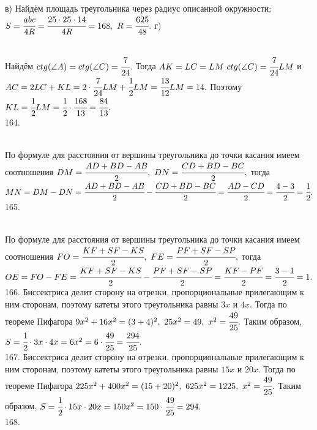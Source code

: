 в) Найдём площадь треугольника через радиус описанной окружности: $S=\cfrac{abc}{4R}=\cfrac{25\cdot25\cdot14}{4R}=168,\ R=\cfrac{625}{48}.$\newpage\noindent
г) \begin{figure}[ht!]
\end{figure}\\
Найдём $ctg(\angle A)=ctg(\angle C)=\cfrac{7}{24}.$ Тогда $AK=LC=LM\ ctg(\angle C)=\cfrac{7}{24}LM$ и $AC=2LC+KL=2\cdot\cfrac{7}{24}LM+\cfrac{1}{2}LM=\cfrac{13}{12}LM=14.$ Поэтому $KL=\cfrac{1}{2}LM=\cfrac{1}{2}\cdot\cfrac{168}{13}=\cfrac{84}{13}.$\\
164. \begin{figure}[ht!]
\end{figure}\\
По формуле для расстояния от вершины треугольника до точки касания имеем соотношения $DM=\cfrac{AD+BD-AB}{2},\ DN=\cfrac{CD+BD-BC}{2},$ тогда\\
$MN=DM-DN=\cfrac{AD+BD-AB}{2}-\cfrac{CD+BD-BC}{2}=\cfrac{AD-CD}{2}=\cfrac{4-3}{2}=\cfrac{1}{2}.$\\
165. \begin{figure}[ht!]
\end{figure}\\
По формуле для расстояния от вершины треугольника до точки касания имеем соотношения $FO=\cfrac{KF+SF-KS}{2},\ FE=\cfrac{PF+SF-SP}{2},$ тогда\\
$OE=FO-FE=\cfrac{KF+SF-KS}{2}-\cfrac{PF+SF-SP}{2}=\cfrac{KF-PF}{2}=\cfrac{3-1}{2}=1.$\\
166. Биссектриса делит сторону на отрезки, пропорциональные прилегающим к ним сторонам, поэтому катеты этого треугольника равны $3x$ и $4x.$ Тогда по теореме Пифагора $9x^2+16x^2=(3+4)^2,\ 25x^2=49,\ x^2=\cfrac{49}{25}.$ Таким образом, $S=\cfrac{1}{2}\cdot3x\cdot4x=6x^2=6\cdot\cfrac{49}{25}=\cfrac{294}{25}.$\\
167. Биссектриса делит сторону на отрезки, пропорциональные прилегающим к ним сторонам, поэтому катеты этого треугольника равны $15x$ и $20x.$ Тогда по теореме Пифагора $225x^2+400x^2=(15+20)^2,\ 625x^2=1225,\ x^2=\cfrac{49}{25}.$ Таким образом, $S=\cfrac{1}{2}\cdot15x\cdot20x=150x^2=150\cdot\cfrac{49}{25}=294.$\\
168. \begin{figure}[ht!]
\end{figure}\\
